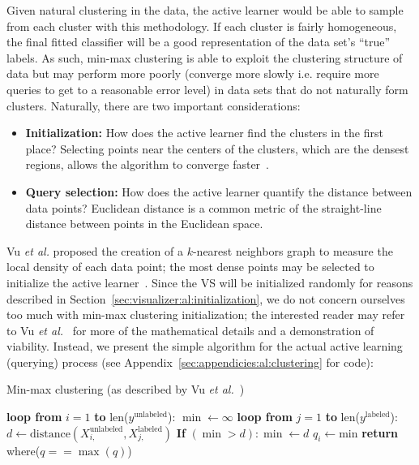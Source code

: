 Given natural clustering in the data, the active learner would be able to 
sample from each cluster with this methodology. If each cluster is fairly 
homogeneous, the final fitted classifier will be a good representation of the 
data set's ``true'' labels. As such, min-max 
clustering is able to exploit the clustering structure of data but 
may perform more poorly (converge more slowly i.e. require more queries to get 
to a reasonable error level) in data sets that do not naturally form clusters. 
Naturally, there are two important considerations:

\tablespacing
\begin{itemize}
	\item \textbf{Initialization:} How does the active learner find the 
	clusters in the first place? Selecting points near the centers of the 
	clusters, which are the densest regions, allows the algorithm 
	to converge faster~\cite{vu2010}.
	
	\item \textbf{Query selection:} How does the active learner quantify the 
	distance between data points? Euclidean distance is a common metric of the 
	straight-line distance between points in the Euclidean space.
\end{itemize}
\bodyspacing

Vu \textit{et al.} proposed the creation of a $k$-nearest neighbors graph 
to measure the local density of each data point; the most dense points may be 
selected to initialize the active learner~\cite{vu2010}. Since the VS will be 
initialized randomly for reasons described in 
Section~\ref{sec:visualizer:al:initialization}, we do not concern ourselves too 
much with min-max clustering initialization; 
the interested reader may refer to Vu \textit{et al.}~\cite{vu2010} for 
more of the mathematical details and a demonstration of viability. 
Instead, we present the simple algorithm for the actual active learning 
(querying) process (see Appendix~\ref{sec:appendicies:al:clustering} for code):

\tablespacing
\begin{algorithm}[H]
	\caption{Min-max clustering (as described by 
		Vu \textit{et al.}~\cite{vu2010})}\label{alg:al:methods:clustering}
	\begin{algorithmic}[1]
		\State \textbf{loop from} $i=1$ \textbf{to} len($y^{\text{unlabeled}}$):
		\State \indent $\min \gets \infty$
		\State \indent \textbf{loop from} $j=1$ \textbf{to} 
		len($y^{\text{labeled}}$):
		\State \indent \indent  $d \gets 
		\text{distance}(X_{i,}^{\text{unlabeled}},X_{j,}^{\text{labeled}})$
		\State \indent \indent \textbf{If} $(\min >d): \min \gets d$
		\State \indent $q_i \gets \text{min}$
		\State \textbf{return} where($q==\max{(q)}$)
		\EndProcedure
	\end{algorithmic}
\end{algorithm}
\bodyspacing